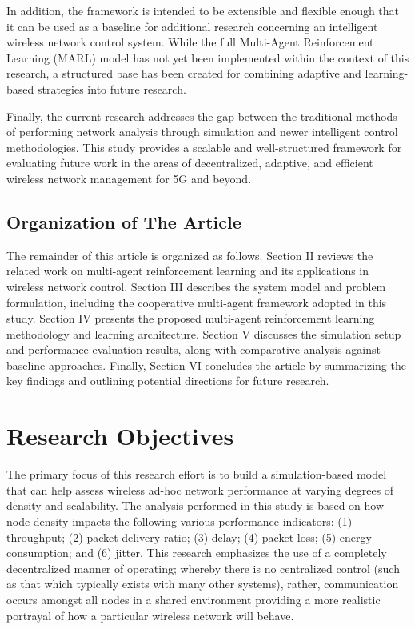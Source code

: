 \documentclass[a4paper,fleqn]{cas-dc}
\numberwithin{equation}{section}
\begin{document}
In addition, the framework is intended to be extensible and flexible enough that it can be used as a baseline for additional research concerning an intelligent wireless network control system. While the full Multi-Agent Reinforcement Learning (MARL) model has not yet been implemented within the context of this research, a structured base has been created for combining adaptive and learning-based strategies into future research.

Finally, the current research addresses the gap between the traditional methods of performing network analysis through simulation and newer intelligent control methodologies. This study provides a scalable and well-structured framework for evaluating future work in the areas of decentralized, adaptive, and efficient wireless network management for 5G and beyond.

\subsection{Organization of The Article}
The remainder of this article is organized as follows. Section II reviews the related work on multi-agent reinforcement learning and its applications in wireless network control. Section III describes the system model and problem formulation, including the cooperative multi-agent framework adopted in this study. Section IV presents the proposed multi-agent reinforcement learning methodology and learning architecture. Section V discusses the simulation setup and performance evaluation results, along with comparative analysis against baseline approaches. Finally, Section VI concludes the article by summarizing the key findings and outlining potential directions for future research.

\section{Research Objectives}

The primary focus of this research effort is to build a simulation-based model that can help assess wireless ad-hoc network performance at varying degrees of density and scalability. The analysis performed in this study is based on how node density impacts the following various performance indicators: (1) throughput; (2) packet delivery ratio; (3) delay; (4) packet loss; (5) energy consumption; and (6) jitter. This research emphasizes the use of a completely decentralized manner of operating; whereby there is no centralized control (such as that which typically exists with many other systems), rather, communication occurs amongst all nodes in a shared environment providing a more realistic portrayal of how a particular wireless network will behave.
\end{document}
